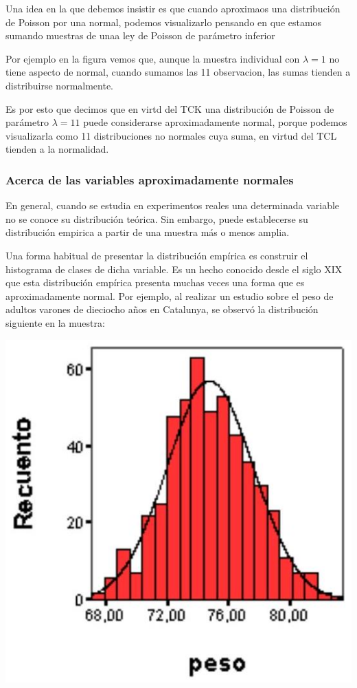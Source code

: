 \documentclass[
]{article}
\begin{document}
Una idea en la que debemos insistir es que cuando aproximaos una distribución de Poisson por una normal, podemos visualizarlo pensando en que estamos sumando muestras de unaa ley de Poisson de parámetro inferior

Por ejemplo en la figura vemos que, aunque la muestra individual con \(\lambda=1\) no tiene aspecto de normal, cuando sumamos las 11 observacion, las sumas tienden a distribuirse normalmente.

Es por esto que decimos que en virtd del TCK una distribución de Poisson de parámetro \(\lambda=11\) puede considerarse aproximadamente normal, porque podemos visualizarla como 11 distribuciones no normales cuya suma, en virtud del TCL tienden a la normalidad.

\subsubsection{Acerca de las variables aproximadamente normales}\label{acerca-de-las-variables-aproximadamente-normales}

En general, cuando se estudia en experimentos reales una determinada variable no se conoce su distribución teórica. Sin embargo, puede establecerse su distribución empirica a partir de una muestra más o menos amplia.

Una forma habitual de presentar la distribución empírica es construir el histograma de clases de dicha variable. Es un hecho conocido desde el siglo XIX que esta distribución empírica presenta muchas veces una forma que es aproximadamente normal. Por ejemplo, al realizar un estudio sobre el peso de adultos varones de dieciocho años en Catalunya, se observó la distribución siguiente en la muestra:

\begin{center}\includegraphics[width=1\linewidth]{images/pesosVaronesCat} \end{center}
\end{document}
